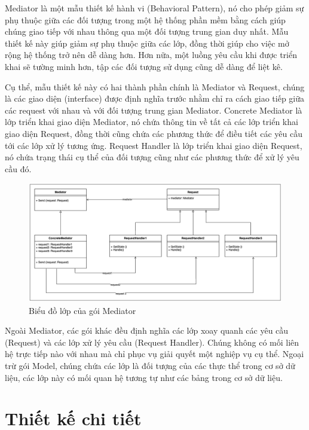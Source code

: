\documentclass[../DoAn.tex]{subfiles}
\begin{document}
\newpage

Mediator là một mẫu thiết kế hành vi (Behavioral Pattern), nó cho phép giảm sự phụ thuộc giữa các đối tượng trong một hệ thống phần mềm bằng cách
giúp chúng giao tiếp với nhau thông qua một đối tượng trung gian duy nhất. Mẫu thiết kế này giúp giảm sự phụ thuộc giữa các lớp, đồng thời giúp cho việc
mở rộng hệ thống trở nên dễ dàng hơn. Hơn nữa, một luồng yêu cầu khi được triển khai sẽ tường minh hơn, tập các đối tượng sử dụng cũng dễ dàng để liệt kê.\cite{DesignPatterns}

Cụ thể, mẫu thiết kế này có hai thành phần chính là Mediator và Request, chúng là các giao diện (interface) được định nghĩa trước nhằm chỉ ra cách
giao tiếp giữa các request với nhau và với đối tượng trung gian Mediator. Concrete Mediator là lớp triển khai giao diện Mediator, nó chứa thông tin về tất cả
các lớp triển khai giao diện Request, đồng thời cũng chứa các phương thức để điều tiết các yêu cầu tới các lớp xử lý tương ứng. Request Handler là lớp triển khai
giao diện Request, nó chứa trạng thái cụ thể của đối tượng cũng như các phương thức để xử lý yêu cầu đó.

\begin{figure}[H]
    \centering
    \includegraphics[width=1.0\linewidth]{Hinhve/ClassDiagram_Mediator.png}
    \caption{Biểu đồ lớp của gói Mediator}
    \label{fig:ClassDiagram_Mediator}
\end{figure}

Ngoài Mediator, các gói khác đều định nghĩa các lớp xoay quanh các yêu cầu (Request) và các lớp xử lý yêu cầu (Request Handler). Chúng không có mối liên hệ trực tiếp
nào với nhau mà chỉ phục vụ giải quyết một nghiệp vụ cụ thể. Ngoại trừ gói Model, chúng chứa các lớp là đối tượng của các thực thể trong cơ sở dữ liệu, các lớp này
có mối quan hệ tương tự như các bảng trong cơ sở dữ liệu.

\newpage


\section{Thiết kế chi tiết}
\label{section:4.2}
\end{document}
